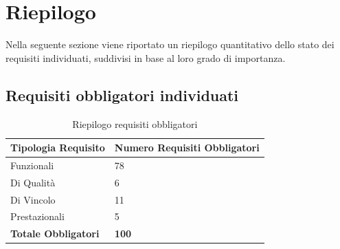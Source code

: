 
\section{Riepilogo}
Nella seguente sezione viene riportato un riepilogo quantitativo dello stato dei requisiti individuati, suddivisi in base al loro grado di importanza.

\subsection{Requisiti obbligatori individuati}
\begin{table}[ht]
	\centering
	\renewcommand{\arraystretch}{1.4}
	\begin{tabularx}{0.8\textwidth}{|l|X|}
		\hline
		\rowcolor{primarycolor!10}
		\textbf{Tipologia Requisito} & \textbf{Numero Requisiti Obbligatori} \\
		\hline
		Funzionali & 78 \\
		\hline
		Di Qualità & 6 \\
		\hline
		Di Vincolo & 11 \\
		\hline
		Prestazionali & 5 \\
		\hline
		\textbf{Totale Obbligatori} & \textbf{100} \\
		\hline
	\end{tabularx}
	\caption{Riepilogo requisiti obbligatori}
\end{table}

